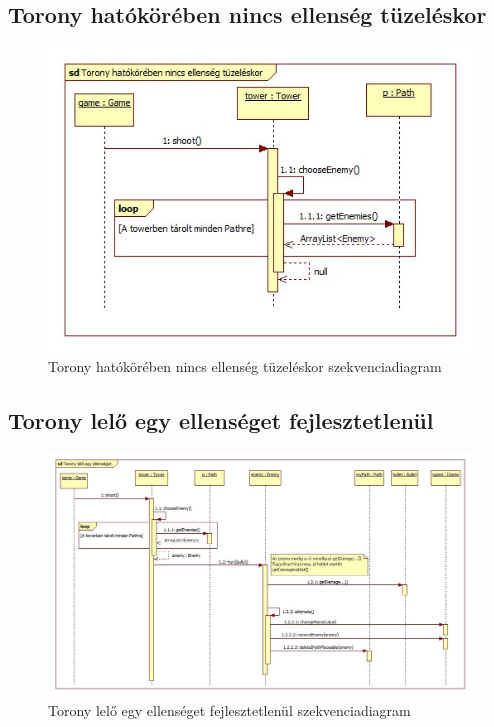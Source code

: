 \subsection{Torony hatókörében nincs ellenség tüzeléskor}
\begin{figure}[H]
\begin{center}
\includegraphics[width=17cm]{chapters/chapter05/images/sd_Torony_hatokoreben_nincs_ellenseg_tuzeleskor.jpg}
\caption{Torony hatókörében nincs ellenség tüzeléskor szekvenciadiagram}
\label{fig:sd_Torony_hatokoreben_nincs_ellenseg_tuzeleskor}
\end{center}
\end{figure}

\subsection{Torony lelő egy ellenséget fejlesztetlenül}
\begin{figure}[H]
\begin{center}
\includegraphics[width=17cm]{chapters/chapter05/images/sd_Torony_lelo_egy_ellenseget_fejlesztetlenul.jpg}
\caption{Torony lelő egy ellenséget fejlesztetlenül szekvenciadiagram}
\label{fig:sd_Torony_lelo_egy_ellenseget_fejlesztetlenul}
\end{center}
\end{figure}

